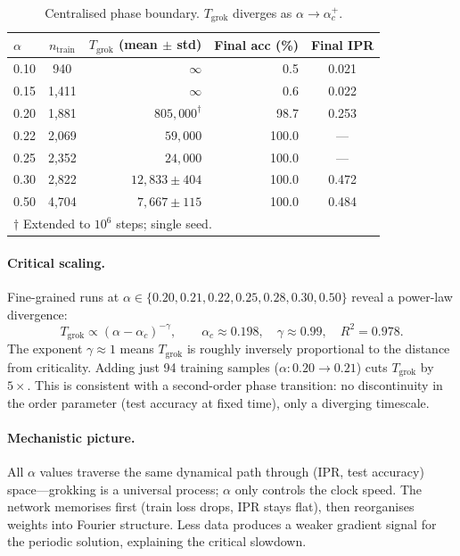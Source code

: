 \documentclass{article}
\begin{document}
\begin{table}[t]
\centering
\small
\caption{Centralised phase boundary. $T_{\mathrm{grok}}$ diverges as $\alpha \to \alpha_c^+$.}
\label{tab:exp1}
\begin{tabular}{lcrrc}
\toprule
$\alpha$ & $n_{\mathrm{train}}$ & $T_{\mathrm{grok}}$ (mean $\pm$ std) & Final acc (\%) & Final IPR \\
\midrule
0.10  &    940 & $\infty$ &   0.5 & 0.021 \\
0.15  & 1{,}411 & $\infty$ &   0.6 & 0.022 \\
0.20  & 1{,}881 & $805{,}000^{\dagger}$ & 98.7 & 0.253 \\
0.22  & 2{,}069 & $59{,}000$ & 100.0 & --- \\
0.25  & 2{,}352 & $24{,}000$ & 100.0 & --- \\
0.30  & 2{,}822 & $12{,}833 \pm 404$  & 100.0 & 0.472 \\
0.50  & 4{,}704 & $7{,}667 \pm 115$   & 100.0 & 0.484 \\
\bottomrule
\multicolumn{5}{l}{\footnotesize $\dagger$ Extended to $10^6$ steps; single seed.}
\end{tabular}
\end{table}

\paragraph{Critical scaling.}
Fine-grained runs at $\alpha \in \{0.20, 0.21, 0.22, 0.25, 0.28, 0.30, 0.50\}$ reveal a power-law divergence:
\begin{equation}
  T_{\mathrm{grok}} \propto (\alpha - \alpha_c)^{-\gamma}, \qquad
  \alpha_c \approx 0.198, \quad \gamma \approx 0.99, \quad R^2 = 0.978.
  \label{eq:scaling}
\end{equation}
The exponent $\gamma \approx 1$ means $T_{\mathrm{grok}}$ is roughly inversely proportional to the distance from criticality.
Adding just 94 training samples ($\alpha: 0.20 \to 0.21$) cuts $T_{\mathrm{grok}}$ by $5\times$.
This is consistent with a second-order phase transition: no discontinuity in the order parameter (test accuracy at fixed time), only a diverging timescale.

\paragraph{Mechanistic picture.}
All $\alpha$ values traverse the same dynamical path through (IPR, test accuracy) space---grokking is a universal process; $\alpha$ only controls the clock speed.
The network memorises first (train loss drops, IPR stays flat), then reorganises weights into Fourier structure.
Less data produces a weaker gradient signal for the periodic solution, explaining the critical slowdown.
\end{document}
